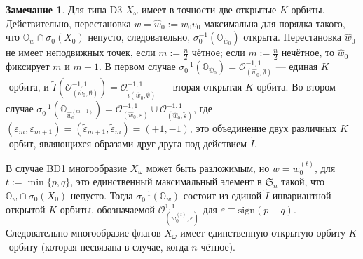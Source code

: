 \documentclass{amsart}
\theoremstyle{definition}
\newtheorem{remark}{Замечание}
\begin{document}
\begin{remark}
Для типа D3
$X_\omega$ имеет в точности две открытые $K$-орбиты.
Действительно, перестановка $w=\hat{w}_0:=w_0v_0$
максимальна для порядка такого, что $\mathbb{O}_w\cap\sigma_0(X_0)$ непусто,
следовательно, $\sigma_0^{-1}(\mathbb{O}_{\hat{w}_0})$ открыта.
Перестановка $\hat{w}_0$ не имеет неподвижных точек, если $m:=\frac{n}{2}$ чётное; если $m:=\frac{n}{2}$ нечётное, то $\hat{w}_0$ фиксирует $m$ и $m+1$.
В первом случае
$\sigma_0^{-1}(\mathbb{O}_{\hat{w}_0})=\mathcal{O}^{-1,1}_{(\hat{w}_0,\emptyset)}$ ---
единая $K$-орбита, и
$\tilde{I}(\mathcal{O}^{-1,1}_{(\hat{w}_0,\emptyset)})=\mathcal{O}^{-1,1}_{\tilde{i}(\hat{w}_0,\emptyset)}$ ---
вторая открытая $K$-орбита.
Во втором случае
$\sigma_0^{-1}(\mathbb{O}_{\hat{w}_0^{(m-1)}})=\mathcal{O}^{-1,1}_{(\hat{w}_0,\varepsilon)}\cup\mathcal{O}^{-1,1}_{(\hat{w}_0,\tilde\varepsilon)}$, где $(\varepsilon_m,\varepsilon_{m+1})=(\tilde\varepsilon_{m+1},\tilde\varepsilon_m)=(+1,-1)$, это объединение двух различных $K$-орбит, являющихся образами друг друга под действием  $\tilde{I}$.

В случае BD1 многообразие $X_\omega$ может быть разложимым,
но $w=w^{(t)}_0$, для $t:=\min\{p,q\}$, это единственный максимальный элемент в $\mathfrak{S}_n$
такой, что $\mathbb{O}_w\cap\sigma_0(X_0)$ непусто.
Тогда $\sigma_0^{-1}(\mathbb{O}_w)$
состоит из единой $\tilde{I}$-инвариантной открытой $K$-орбиты, обозначаемой
$\mathcal{O}^{1,1}_{(w^{(t)}_0,\varepsilon)}$ для $\varepsilon\equiv\mathrm{sign}(p-q)$.
Следовательно многообразие флагов $X_\omega$  имеет единственную открытую орбиту  $K$-орбиту (которая несвязана в случае, когда $n$ чётное).
\end{remark}
\end{document}
